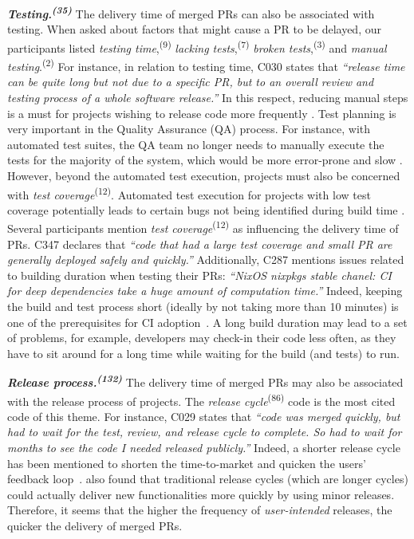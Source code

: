 \vspace{0.6mm}
\noindent\textit{\textbf{Testing.\textsuperscript{(35)}}} The delivery time of merged PRs can also be associated with testing. When asked about factors that might cause a PR to be delayed, our participants listed \textit{testing time},\textsuperscript{(9)} \textit{lacking tests},\textsuperscript{(7)} \textit{broken tests},\textsuperscript{(3)} and \textit{manual testing}.\textsuperscript{(2)} For instance, in relation to testing time, C030 states that \textit{``release time can be quite long but not due to a specific PR, but to an overall review and testing process of a whole software release.''} 
In this respect, reducing manual steps is a must for projects wishing to release code more frequently \citep{neely2013continuous}. Test planning is very important in the Quality Assurance (QA) process. For instance, with automated test suites, the QA team no longer needs to manually execute the tests for the majority of the system, which would be more error-prone and slow \citep{neely2013continuous}. However, beyond the automated test execution, projects must also be concerned with \textit{test coverage}\textsuperscript{(12)}. Automated test execution for projects with low test coverage potentially leads to certain bugs not being identified during build time \citep{felidre2019continuous}. Several participants mention \textit{test coverage}\textsuperscript{(12)} as influencing the delivery time of PRs. C347 declares that \textit{``code that had a large test coverage and small PR are generally deployed safely and quickly.''}
Additionally, C287 mentions issues related to building duration when testing their PRs: \textit{``NixOS nixpkgs stable chanel: CI for deep dependencies take a huge amount of computation time.''} Indeed, keeping the build and test process short (ideally by not taking more than 10 minutes) is one of the prerequisites for CI adoption~\citep{Humble2010-ca}. A long build duration may lead to a set of problems, for example, developers may check-in their code less often, as they have to sit around for a long time while waiting for the build (and tests) to run. 

\vspace{0.6mm}
\noindent\textit{\textbf{Release process.\textsuperscript{(132)}}} The delivery time of merged PRs may also be associated with the release process of projects. The \textit{release cycle}\textsuperscript{(86)} code is the most cited code of this theme. For instance, C029 states that \textit{``code was merged quickly, but had to wait for the test, review, and release cycle to complete. So had to wait for months to see the code I needed released publicly.''} 
Indeed, a shorter release cycle has been mentioned to shorten the time-to-market and quicken the users' feedback loop~\citep{da2016agility}. \cite{daCosta2018impact} also found that traditional release cycles (which are longer cycles) could actually deliver new functionalities more quickly by using minor releases. Therefore, it seems that the higher the frequency of {\em user-intended} releases, the quicker the delivery of merged PRs. 

